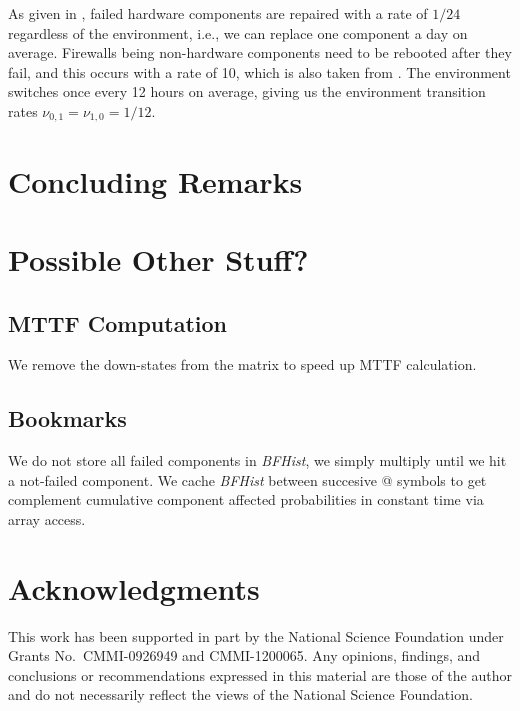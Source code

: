 \documentclass[12pt]{article}
\newcommand{\varName}[1]{\textrm{\it#1}}
\begin{document}
As given in \cite{Godd:2001}, failed hardware components are repaired with a
rate of $1 / 24$ regardless of the environment, i.e., we can replace one component
a day on average. Firewalls being non-hardware components need to be rebooted
after they fail, and this occurs with a rate of 10, which is also taken from
\cite{Godd:2001}. The environment switches once every 12 hours on average,
giving us the environment transition rates $\nu_{0, 1} = \nu_{1, 0} = 1 / 12$.


\section{Concluding Remarks}
\label{sec:conc}


\section{Possible Other Stuff?}
\subsection{MTTF Computation}
We remove the down-states from the matrix to speed up MTTF calculation.

\subsection{Bookmarks}
We do not store all failed components in \varName{BFHist}, we simply multiply
until we hit a not-failed component. We cache \varName{BFHist} between succesive @  symbols
to get complement cumulative component affected probabilities in constant
time via array access.


\section*{Acknowledgments}

This work has been supported in part by the National Science Foundation under
Grants No.\ CMMI-0926949 and CMMI-1200065. Any opinions, findings, and
conclusions or recommendations expressed in this material are those of the
author and do not necessarily reflect the views of the National Science
Foundation. 




\end{document}

